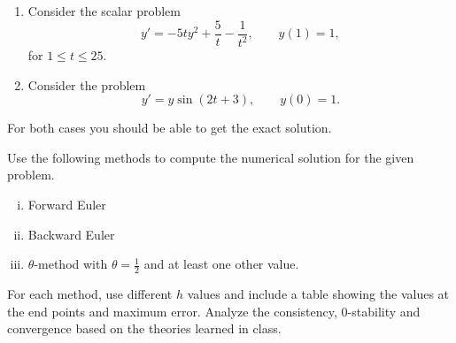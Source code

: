 \begin{problem}[Handout]
  \begin{enumerate}
    \item Consider the scalar problem
    \[
      y' = -5ty^2 + \frac{5}{t} - \frac{1}{t^2}, \qquad y(1) = 1,
    \]
    for $1 \leq t \leq 25$.
    \item Consider the problem
    \[
      y' = y \sin(2t + 3), \qquad y(0) = 1.
    \]
  \end{enumerate}
  For both cases you should be able to get the exact solution.
  
  Use the following methods to compute the numerical solution for the given problem.
  \begin{enumerate}[(i)]
    \item Forward Euler
    \item Backward Euler
    \item $\theta$-method with $\theta = \frac12$ and at least one other value.
  \end{enumerate}
  
  For each method, use different $h$ values and include a table showing the values at the end points and maximum error. Analyze the consistency, $0$-stability and convergence based on the theories learned in class. 
\end{problem}